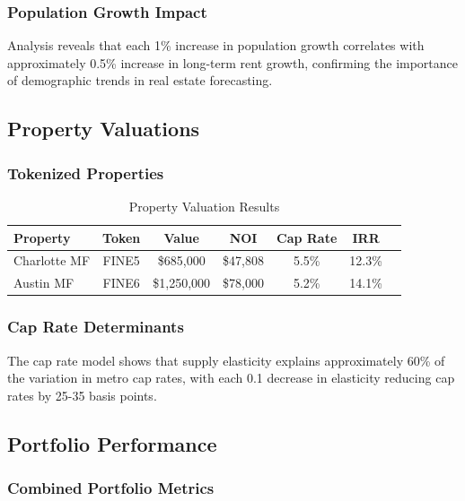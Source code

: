 ﻿\documentclass[12pt]{article}
\begin{document}
\subsubsection{Population Growth Impact}

Analysis reveals that each 1\% increase in population growth correlates with approximately 0.5\% increase in long-term rent growth, confirming the importance of demographic trends in real estate forecasting.

\subsection{Property Valuations}

\subsubsection{Tokenized Properties}

\begin{table}[H]
\centering
\caption{Property Valuation Results}
\label{tab:property-results}
\begin{tabular}{@{}lcccccc@{}}
\toprule
\textbf{Property} & \textbf{Token} & \textbf{Value} & \textbf{NOI} & \textbf{Cap Rate} & \textbf{IRR} \\
\midrule
Charlotte MF & FINE5 & \$685,000 & \$47,808 & 5.5\% & 12.3\% \\
Austin MF & FINE6 & \$1,250,000 & \$78,000 & 5.2\% & 14.1\% \\
\bottomrule
\end{tabular}
\end{table}

\subsubsection{Cap Rate Determinants}

The cap rate model shows that supply elasticity explains approximately 60\% of the variation in metro cap rates, with each 0.1 decrease in elasticity reducing cap rates by 25-35 basis points.

\subsection{Portfolio Performance}

\subsubsection{Combined Portfolio Metrics}
\end{document}
